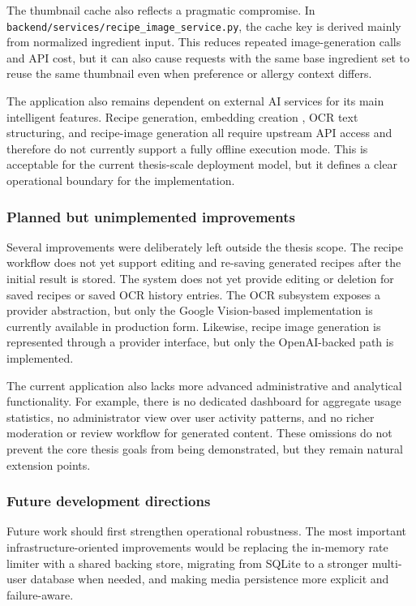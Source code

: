 The thumbnail cache also reflects a pragmatic compromise. In
\texttt{backend/services/recipe\_image\_service.py}, the cache key is
derived mainly from normalized ingredient input. This reduces repeated
image-generation calls and API cost, but it can also cause requests with
the same base ingredient set to reuse the same thumbnail even when
preference or allergy context differs.

The application also remains dependent on external AI services for its
main intelligent features. Recipe generation, embedding creation
\cite{openai2026embeddings}, OCR text structuring, and recipe-image
generation all require upstream API access and therefore do not
currently support a fully offline execution mode. This is acceptable
for the current thesis-scale deployment model, but it defines a clear
operational boundary for the implementation.

\subsubsection{Planned but unimplemented improvements}

Several improvements were deliberately left outside the thesis scope.
The recipe workflow does not yet support editing and re-saving generated
recipes after the initial result is stored. The system does not yet
provide editing or deletion for saved recipes or saved OCR history
entries. The OCR subsystem exposes a provider abstraction, but only the
Google Vision-based implementation \cite{google2026vision} is currently
available in production form. Likewise, recipe image generation is
represented through a provider interface, but only the OpenAI-backed
path \cite{openai2026images,openai2026api} is implemented.

The current application also lacks more advanced administrative and
analytical functionality. For example, there is no dedicated dashboard
for aggregate usage statistics, no administrator view over user activity
patterns, and no richer moderation or review workflow for generated
content. These omissions do not prevent the core thesis goals from being
demonstrated, but they remain natural extension points.

\subsubsection{Future development directions}

Future work should first strengthen operational robustness. The most
important infrastructure-oriented improvements would be replacing the
in-memory rate limiter with a shared backing store, migrating from
SQLite to a stronger multi-user database when needed, and making media
persistence more explicit and failure-aware.

